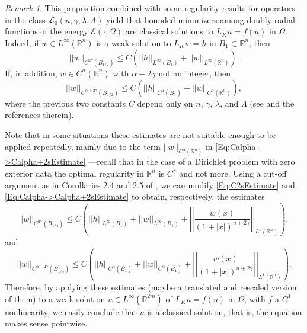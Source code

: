 \documentclass[12pt,reqno]{amsart}
\theoremstyle{definition}
\theoremstyle{remark}
\newtheorem{remark}[theorem]{Remark}
\newcommand{\con}[1]{\mathbb{#1}}
\newcommand{\R}{\con{R}} %
\newcommand{\ecal}{\mathcal{E}}
\newcommand{\lcal}{\mathcal{L}}
\newcommand{\norm}[1]{\left | \left |{#1} \right | \right |}
\newcommand{\s}{\gamma}
\newcommand{\bpar}[1]{\left ( {#1}\right )}
\numberwithin{equation}{section}
\begin{document}
	\begin{remark}
		\label{Remark:InteriorRegularity}
		This proposition combined with some regularity results for operators in the class $\lcal_0(n,\s,\lambda, \Lambda)$ yield that bounded minimizers among doubly radial functions of the energy $\ecal(\cdot,\Omega)$ are classical solutions to $L_K u = f(u)$ in $\Omega$. Indeed, if $w\in L^\infty (\R^n)$ is a weak solution to $L_K w = h$ in $B_1\subset \R^n$, then
		\begin{equation}
		\label{Eq:C2sEstimate}
		\norm{w}_{C^{2\s} (\overline{B_{1/2}})} \leq C\bpar{\norm{h}_{L^\infty (B_1)} + \norm{w}_{L^\infty  (\R^n)}}.
		\end{equation} 
		If, in addition, $w \in C^\alpha (\R^n)$ with $\alpha + 2\s$ not an integer, then
		\begin{equation}
		\label{Eq:Calpha->Calpha+2sEstimate}
		\norm{w}_{C^{\alpha + 2\s} (\overline{B_{1/2}})} \leq C\bpar{\norm{h}_{C^{\alpha} (\overline{B_1})} + \norm{w}_{C^\alpha (\R^n)} },
		\end{equation}
		where the previous two constants $C$ depend only on $n$, $\s$, $\lambda$, and $\Lambda$ (see \cite{RosOton-Survey,SerraC2s+alphaRegularity} and the references therein).
		
		
		Note that in some situations these estimates are not suitable enough to be applied repeatedly, mainly due to the term $\norm{w}_{C^\alpha (\R^n)}$ in \eqref{Eq:Calpha->Calpha+2sEstimate} ---recall that in the case of a Dirichlet problem with zero exterior data the optimal regularity in $\R^n$ is $C^\s$ and not more. Using a cut-off argument as in Corollaries 2.4 and 2.5 of \cite{RosOtonSerra-Regularity}, we can modify \eqref{Eq:C2sEstimate} and \eqref{Eq:Calpha->Calpha+2sEstimate} to obtain, respectively, the estimates
		\begin{equation}
		\label{Eq:C2sEstimateBalls}
		\norm{w}_{C^{2\s} (\overline{B_{1/4}})} \leq C\bpar{\norm{h}_{L^\infty (B_1)} + \norm{w}_{L^\infty  (B_1)} + \norm{\dfrac{w(x)}{(1+|x|)^{n+2\s}}}_{L^1(\R^n)} },
		\end{equation}
		and 
		\begin{equation}
		\label{Eq:Calpha->Calpha+2sEstimateBalls}
		\norm{w}_{C^{\alpha + 2\s} (\overline{B_{1/4}})} \leq C\bpar{\norm{h}_{C^{\alpha} (\overline{B_1})} + \norm{w}_{C^\alpha (\overline{B_1})} + \norm{\dfrac{w(x)}{(1+|x|)^{n+2\s}}}_{L^1(\R^n)} }.
		\end{equation}
		Therefore, by applying these estimates (maybe a translated and rescaled version of them) to a weak solution $u\in L^\infty(\R^{2m})$ of $L_K u = f(u)$ in $\Omega$, with $f$ a $C^1$ nonlinearity, we easily conclude that $u$ is a classical solution, that is, the equation makes sense pointwise.
	\end{remark}
	
\end{document}
